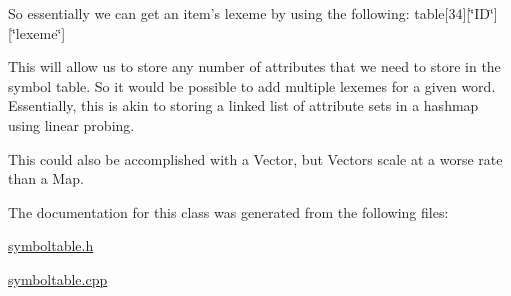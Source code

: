 So essentially we can get an item's lexeme by using the following: table\mbox{[}34\mbox{]}\mbox{[}\char`\"{}ID\char`\"{}\mbox{]}\mbox{[}\char`\"{}lexeme\char`\"{}\mbox{]}

This will allow us to store any number of attributes that we need to store in the symbol table. So it would be possible to add multiple lexemes for a given word. Essentially, this is akin to storing a linked list of attribute sets in a hashmap using linear probing.

This could also be accomplished with a Vector, but Vectors scale at a worse rate than a Map. 

The documentation for this class was generated from the following files:\begin{DoxyCompactItemize}
\item 
\hyperlink{symboltable_8h}{symboltable.h}\item 
\hyperlink{symboltable_8cpp}{symboltable.cpp}\end{DoxyCompactItemize}
